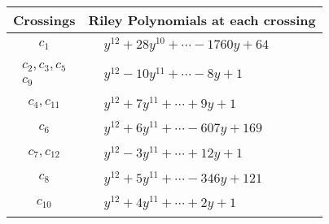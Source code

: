 \documentclass[1p]{elsarticle_modified}
\theoremstyle{definition}
\begin{document}
\begin{tabular}{m{50pt}|m{274pt}}
Crossings & \hspace{64pt}Riley Polynomials at each crossing \\
\hline $$\begin{aligned}c_{1}\end{aligned}$$&$\begin{aligned}
&y^{12}+28 y^{10}+\cdots-1760 y+64
\end{aligned}$\\
\hline $$\begin{aligned}c_{2},c_{3},c_{5}\\c_{9}\end{aligned}$$&$\begin{aligned}
&y^{12}-10 y^{11}+\cdots-8 y+1
\end{aligned}$\\
\hline $$\begin{aligned}c_{4},c_{11}\end{aligned}$$&$\begin{aligned}
&y^{12}+7 y^{11}+\cdots+9 y+1
\end{aligned}$\\
\hline $$\begin{aligned}c_{6}\end{aligned}$$&$\begin{aligned}
&y^{12}+6 y^{11}+\cdots-607 y+169
\end{aligned}$\\
\hline $$\begin{aligned}c_{7},c_{12}\end{aligned}$$&$\begin{aligned}
&y^{12}-3 y^{11}+\cdots+12 y+1
\end{aligned}$\\
\hline $$\begin{aligned}c_{8}\end{aligned}$$&$\begin{aligned}
&y^{12}+5 y^{11}+\cdots-346 y+121
\end{aligned}$\\
\hline $$\begin{aligned}c_{10}\end{aligned}$$&$\begin{aligned}
&y^{12}+4 y^{11}+\cdots+2 y+1
\end{aligned}$\\
\hline
\end{tabular}\\~\\
\end{document}
